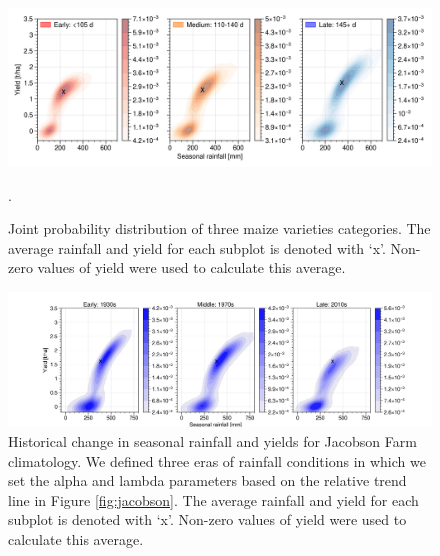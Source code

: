 \documentclass[draft]{agujournal2019}
\begin{document}
\begin{figure}%
\centering
\includegraphics[width=140mm]{fig9_varietiesPDF.png}
\caption{Joint probability distribution of three maize varieties categories. The average rainfall and yield for each subplot is denoted with `x'. Non-zero values of yield were used to calculate this average.}.
\label{fig:varietiesPDF}
\end{figure}



\begin{figure}%
\centering
\includegraphics[width=140mm]{fig10_erasPDF.png}
\caption{Historical change in seasonal rainfall and yields for Jacobson Farm climatology. We defined three eras of rainfall conditions in which we set the alpha and lambda parameters based on the relative trend line in Figure \ref{fig:jacobson}. The average rainfall and yield for each subplot is denoted with `x'. Non-zero values of yield were used to calculate this average.}
\label{fig:cropoutcomesPDF}
\end{figure}
\end{document}
